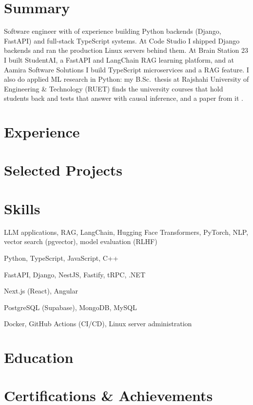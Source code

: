 \documentclass[10pt, a4paper]{article}
\begin{document}
\color{primary}
\cvheader

\section{Summary}
Software engineer with \factExpYears{} of experience building Python backends (Django, FastAPI) and full-stack TypeScript systems. At Code Studio I shipped Django backends and ran the production Linux servers behind them. At Brain Station 23 I built StudentAI, a FastAPI and LangChain RAG learning platform, and at Aamira Software Solutions I build TypeScript microservices and a RAG feature. I also do applied ML research in Python: my B.Sc.\ thesis at Rajshahi University of Engineering \& Technology (RUET) finds the university courses that hold students back and tests that answer with causal inference, and a paper from it \factLakIs{}.

\section{Experience}





\section{Selected Projects}



\section{Skills}
\begin{description}[style=unboxed, leftmargin=0pt, itemsep=0.2ex]
    \item[AI/ML:] LLM applications, RAG, LangChain, Hugging Face Transformers, PyTorch, NLP, vector search (pgvector), model evaluation (RLHF)
    \item[Languages:] Python, TypeScript, JavaScript, C++
    \item[Backend:] FastAPI, Django, NestJS, Fastify, tRPC, .NET
    \item[Frontend:] Next.js (React), Angular
    \item[Databases:] PostgreSQL (Supabase), MongoDB, MySQL
    \item[DevOps:] Docker, GitHub Actions (CI/CD), Linux server administration
\end{description}

\section{Education}
\def\eduthesisline{}


\section{Certifications \& Achievements}
\def\certindustry{}

\end{document}
